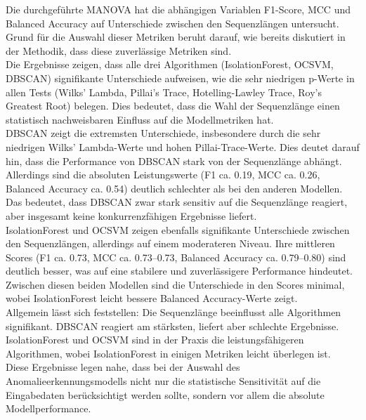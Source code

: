\documentclass[a4paper,12pt]{article}
\begin{document}
	Die durchgeführte MANOVA hat die abhängigen Variablen F1-Score, MCC und Balanced Accuracy auf Unterschiede zwischen den Sequenzlängen untersucht. Grund für die Auswahl dieser Metriken beruht darauf, wie bereits diskutiert in der Methodik, dass diese zuverlässige Metriken sind.
	\\[0.5em]
	Die Ergebnisse zeigen, dass alle drei Algorithmen (IsolationForest, OCSVM, DBSCAN) signifikante Unterschiede aufweisen, wie die sehr niedrigen p-Werte in allen Tests (Wilks’ Lambda, Pillai’s Trace, Hotelling-Lawley Trace, Roy’s Greatest Root) belegen. Dies bedeutet, dass die Wahl der Sequenzlänge einen statistisch nachweisbaren Einfluss auf die Modellmetriken hat.
	\\[0.5em]
	DBSCAN zeigt die extremsten Unterschiede, insbesondere durch die sehr niedrigen Wilks’ Lambda-Werte und hohen Pillai-Trace-Werte. Dies deutet darauf hin, dass die Performance von DBSCAN stark von der Sequenzlänge abhängt. Allerdings sind die absoluten Leistungswerte (F1 ca. 0.19, MCC ca. 0.26, Balanced Accuracy ca. 0.54) deutlich schlechter als bei den anderen Modellen. Das bedeutet, dass DBSCAN zwar stark sensitiv auf die Sequenzlänge reagiert, aber insgesamt keine konkurrenzfähigen Ergebnisse liefert.
	\\[0.5em]
	IsolationForest und OCSVM zeigen ebenfalls signifikante Unterschiede zwischen den Sequenzlängen, allerdings auf einem moderateren Niveau. Ihre mittleren Scores (F1 ca. 0.73, MCC ca. 0.73–0.73, Balanced Accuracy ca. 0.79–0.80) sind deutlich besser, was auf eine stabilere und zuverlässigere Performance hindeutet. Zwischen diesen beiden Modellen sind die Unterschiede in den Scores minimal, wobei IsolationForest leicht bessere Balanced Accuracy-Werte zeigt.
	\\[0.5em]
	Allgemein lässt sich feststellen: Die Sequenzlänge beeinflusst alle Algorithmen signifikant. DBSCAN reagiert am stärksten, liefert aber schlechte Ergebnisse. IsolationForest und OCSVM sind in der Praxis die leistungsfähigeren Algorithmen, wobei IsolationForest in einigen Metriken leicht überlegen ist.
	\\[0.5em]
	Diese Ergebnisse legen nahe, dass bei der Auswahl des Anomalieerkennungsmodells nicht nur die statistische Sensitivität auf die Eingabedaten berücksichtigt werden sollte, sondern vor allem die absolute Modellperformance.
	
\end{document}
